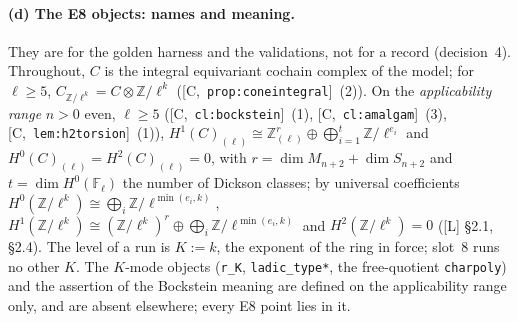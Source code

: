 \documentclass[11pt]{article}
\theoremstyle{remark}
\newcommand{\F}{\mathbb{F}}
\newcommand{\Z}{\mathbb{Z}}
\newcommand{\Fl}{\F_\ell}
\newcommand{\HA}[1]{[C,~\texttt{#1}]}      %
\begin{document}
\paragraph{(d) The E8 objects: names and meaning.}
They are for the golden harness and the validations, not for a record (decision~4). Throughout,
$C$ is the integral equivariant cochain complex of the model; for $\ell\ge5$,
$C_{\Z/\ell^k}=C\otimes\Z/\ell^k$ (\HA{prop:coneintegral}~(2)). On the \emph{applicability range}
$n>0$ even, $\ell\ge5$ (\HA{cl:bockstein}~(1), \HA{cl:amalgam}~(3), \HA{lem:h2torsion}~(1)),
$H^1(C)_{(\ell)}\cong\Z_{(\ell)}^{r}\oplus\bigoplus_{i=1}^{t}\Z/\ell^{e_i}$ and
$H^0(C)_{(\ell)}=H^2(C)_{(\ell)}=0$, with $r=\dim M_{n+2}+\dim S_{n+2}$ and $t=\dim H^0(\Fl)$ the
number of Dickson classes; by universal coefficients
$H^0(\Z/\ell^k)\cong\bigoplus_i\Z/\ell^{\min(e_i,k)}$,
$H^1(\Z/\ell^k)\cong(\Z/\ell^k)^r\oplus\bigoplus_i\Z/\ell^{\min(e_i,k)}$ and $H^2(\Z/\ell^k)=0$
([L] \S2.1, \S2.4). The level of a run is $K:=k$, the exponent of the ring in force; slot~8 runs
no other $K$. The $K$-mode objects (\texttt{r\_K}, \texttt{ladic\_type*}, the free-quotient
\texttt{charpoly}) and the assertion of the Bockstein meaning are defined on the applicability
range only, and are absent elsewhere; every E8 point lies in it.
\end{document}
